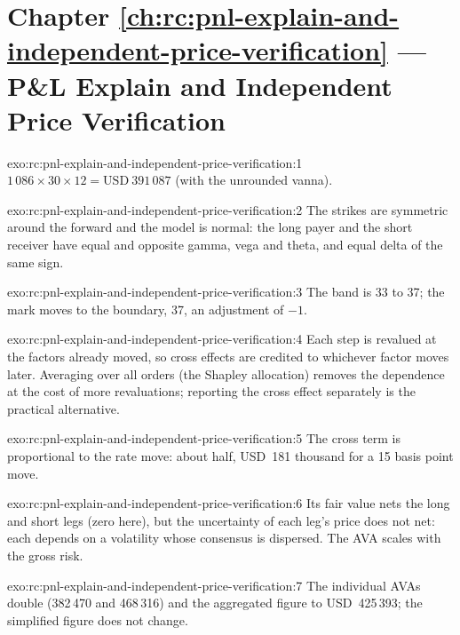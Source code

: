 \section*{Chapter \ref{ch:rc:pnl-explain-and-independent-price-verification} --- P\&L Explain and Independent Price Verification}

\begin{solution}{exo:rc:pnl-explain-and-independent-price-verification:1}
$1\,086\times30\times12 = \text{USD}~391\,087$ (with the unrounded vanna).
\end{solution}

\begin{solution}{exo:rc:pnl-explain-and-independent-price-verification:2}
The strikes are symmetric around the forward and the model is normal: the long payer and the short
receiver have equal and opposite gamma, vega and theta, and equal delta of the same sign.
\end{solution}

\begin{solution}{exo:rc:pnl-explain-and-independent-price-verification:3}
The band is 33 to 37; the mark moves to the boundary, 37, an adjustment of $-1$.
\end{solution}

\begin{solution}{exo:rc:pnl-explain-and-independent-price-verification:4}
Each step is revalued at the factors already moved, so cross effects are credited to whichever factor
moves later. Averaging over all orders (the Shapley allocation) removes the dependence at the cost of
more revaluations; reporting the cross effect separately is the practical alternative.
\end{solution}

\begin{solution}{exo:rc:pnl-explain-and-independent-price-verification:5}
The cross term is proportional to the rate move: about half, USD~181 thousand for a 15 basis point move.
\end{solution}

\begin{solution}{exo:rc:pnl-explain-and-independent-price-verification:6}
Its fair value nets the long and short legs (zero here), but the uncertainty of each leg's price does not
net: each depends on a volatility whose consensus is dispersed. The AVA scales with the gross risk.
\end{solution}

\begin{solution}{exo:rc:pnl-explain-and-independent-price-verification:7}
The individual AVAs double (382\,470 and 468\,316) and the aggregated figure to USD~425\,393; the
simplified figure does not change.
\end{solution}

